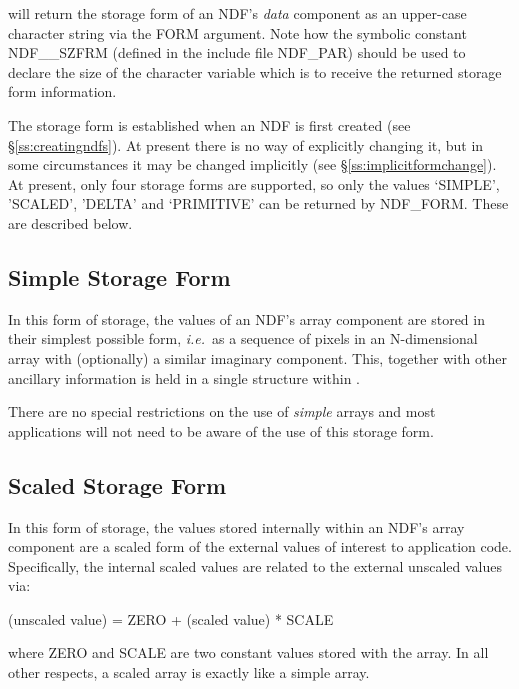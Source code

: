 \documentclass[twoside,11pt,nolof]{starlink}
\providecommand{\st}[1]{{\emph{#1}}}
\begin{document}
will return the storage form of an NDF's \st{data\/} component as an
upper-case character string via the FORM argument.
Note how the symbolic constant NDF\_\_SZFRM (defined in the include file
NDF\_PAR) should be used to declare the size of the character variable which
is to receive the returned storage form information.

The storage form is established when an NDF is first created (see
\S\ref{ss:creatingndfs}).
At present there is no way of explicitly changing it, but in some
circumstances it may be changed implicitly (see
\S\ref{ss:implicitformchange}).
At present, only four storage forms are supported, so only the values
`SIMPLE', 'SCALED', 'DELTA' and `PRIMITIVE' can be returned by NDF\_FORM.
These are described below.

\subsection{\label{ss:simpleform}Simple Storage Form}

In this form of storage, the values of an NDF's array component
are stored in their simplest possible form, \st{i.e.}\ as a sequence of
pixels in an N-dimensional array with (optionally) a similar imaginary
component.
This, together with other ancillary information is held in a single
 structure within .

There are no special restrictions on the use of \st{simple\/} arrays and most
applications will not need to be aware of the use of this storage form.

\subsection{\label{ss:scaledform}Scaled Storage Form}

In this form of storage, the values stored internally within an NDF's array
component are a scaled form of the external values of interest to
application code. Specifically, the internal scaled values are related to
the external unscaled values via:

\begin{terminalv}
         (unscaled value) = ZERO + (scaled value) * SCALE
\end{terminalv}

where ZERO and SCALE are two constant values stored with the array. In
all other respects, a scaled array is exactly like a simple array.
\end{document}
